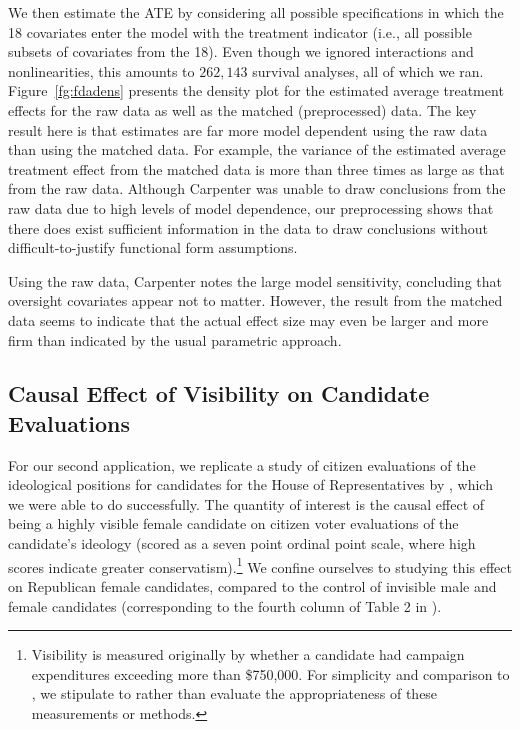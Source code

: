 \documentclass[11pt,titlepage]{article}
\begin{document}
We then estimate the ATE by considering all possible specifications in
which the 18 covariates enter the model with the treatment indicator
(i.e., all possible subsets of covariates from the 18).  Even though
we ignored interactions and nonlinearities, this amounts to $262,143$
survival analyses, all of which we ran. Figure~\ref{fg:fdadens}
presents the density plot for the estimated average treatment effects
for the raw data as well as the matched (preprocessed) data.  The key
result here is that estimates are far more model dependent using the
raw data than using the matched data.  For example, the variance of
the estimated average treatment effect from the matched data is more
than three times as large as that from the raw data.  Although
Carpenter was unable to draw conclusions from the raw data due to
high levels of model dependence, our preprocessing shows that there
does exist sufficient information in the data to draw conclusions
without difficult-to-justify functional form assumptions.

Using the raw data, Carpenter notes the large model sensitivity,
concluding that oversight covariates appear not to matter.  However,
the result from the matched data seems to indicate that the actual
effect size may even be larger and more firm than indicated by the
usual parametric approach.

\subsection{Causal Effect of Visibility on Candidate
  Evaluations}

For our second application, we replicate a study of citizen
evaluations of the ideological positions for candidates for the House
of Representatives by \citet{Koch02}, which we were able to do
successfully.  The quantity of interest is the causal effect of being
a highly visible female candidate on citizen voter evaluations of the
candidate's ideology (scored as a seven point ordinal point scale,
where high scores indicate greater conservatism).\footnote{Visibility
  is measured originally by whether a candidate had campaign
  expenditures exceeding more than \$750,000.  For simplicity and
  comparison to \citet{Koch02}, we stipulate to rather than evaluate
  the appropriateness of these measurements or methods.}  We confine
ourselves to studying this effect on Republican female candidates,
compared to the control of invisible male and female candidates
(corresponding to the fourth column of Table 2 in \citet[p.
459]{Koch02}).
\end{document}
